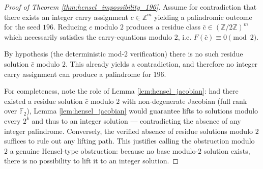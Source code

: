 \documentclass[12pt,a4paper]{article}
\begin{document}
\begin{proof}[Proof of Theorem \ref{thm:hensel_impossibility_196}]
Assume for contradiction that there exists an integer carry assignment $c\in\mathbb Z^m$ yielding a palindromic outcome for the seed $196$. Reducing $c$ modulo $2$ produces a residue class $\bar c\in (\mathbb Z/2\mathbb Z)^m$ which necessarily satisfies the carry-equations modulo $2$, i.e. $F(\bar c)\equiv 0\pmod 2$.

By hypothesis (the deterministic mod-2 verification) there is no such residue solution $\bar c$ modulo $2$. This already yields a contradiction, and therefore no integer carry assignment can produce a palindrome for $196$.

For completeness, note the role of Lemma \ref{lem:hensel_jacobian}: had there existed a residue solution $\bar c$ modulo $2$ with non-degenerate Jacobian (full rank over $\mathbb F_2$), Lemma \ref{lem:hensel_jacobian} would guarantee lifts to solutions modulo every $2^k$ and thus to an integer solution — contradicting the absence of any integer palindrome. Conversely, the verified absence of residue solutions modulo $2$ suffices to rule out any lifting path. This justifies calling the obstruction modulo $2$ a genuine Hensel-type obstruction: because no base modulo-$2$ solution exists, there is no possibility to lift it to an integer solution.
\end{proof}
\end{document}
